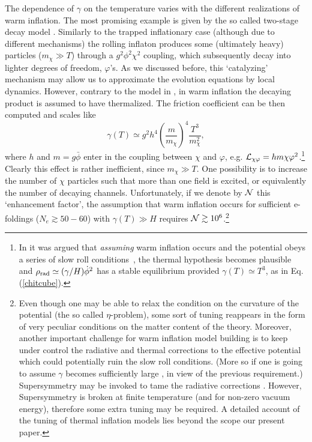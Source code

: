 \documentclass[11pt,amsmath,floats,floatfix,nofootinbib,secnumarabic, superscriptaddress, tightenlines]{revtex4}
\newcommand{\beq}{\begin{equation}}
\newcommand{\eeq}{\end{equation}}
\newcommand{\calL}{{\cal L}}
\newcommand{\bphi}{{\bar\phi}}
\begin{document}
{The dependence of $\gamma$ on the temperature varies with the different realizations of warm inflation. The most promising example is given by the so called two-stage decay model \cite{warm}. Similarly to the trapped inflationary case (although due to different mechanisms) the rolling inflaton produces some (ultimately heavy) particles ($m_\chi \gg T$) through a $g^2\phi^2\chi^2$ coupling, which subsequently decay into lighter degrees of freedom, $\varphi$'s. As we discussed before, this `catalyzing' mechanism may allow us to approximate the evolution equations by local dynamics. However, contrary to the model in \cite{trapped}, in warm inflation the decaying product is assumed to have thermalized. The friction coefficient can be then computed and scales like \cite{warm}
\beq
\label{chitcube}
\gamma(T) \simeq g^2 h^4 \left(\frac{m}{m_\chi}\right)^4 \frac{T^3}{m_\chi^2},
\eeq
where $h$ and $m=g\bphi$ enter in the coupling between $\chi$ and $\varphi$, e.g. $\calL_{\chi\varphi} = hm\chi\varphi^2$.\footnote{In \cite{reheating} it was argued that {\it assuming} warm inflation occurs and the potential obeys a series of slow roll conditions~\cite{warm}, the thermal hypothesis becomes plausible and $\rho_{\rm rad} \simeq (\gamma/H) \dot\phi^2$ has a stable equilibrium provided $\gamma(T) \simeq T^3$, as in Eq. (\ref{chitcube}).}
Clearly this effect is rather inefficient, since $m_\chi \gg T$. One possibility is to increase the number of $\chi$ particles such that more than one field is excited, or equivalently the number of decaying channels. Unfortunately, if we denote by $\cal N$ this `enhancement factor', the assumption that warm inflation occurs for sufficient e-foldings ($N_e \gtrsim 50-60$) with $\gamma(T) \gg H$ requires ${\cal N} \gtrsim 10^6$\cite{bastero,bueno}.\footnote{Even though one may be able to relax the condition on the curvature of the potential (the so called $\eta$-problem), some sort of tuning reappears in the form of very peculiar conditions on the matter content of the theory. Moreover, another important challenge for warm inflation model building is to keep under control the radiative and thermal corrections to the effective potential which could potentially ruin the slow roll conditions. (More so if one is going to assume $\gamma$ becomes sufficiently large \cite{linde}, in view of the previous requirement.) Supersymmetry may be invoked to tame the radiative corrections \cite{hall}. However, Supersymmetry is broken at finite temperature (and for non-zero vacuum energy), therefore some extra tuning may be required. A detailed account of the tuning of thermal inflation models lies beyond the scope our present paper.}\\

}
\end{document}
